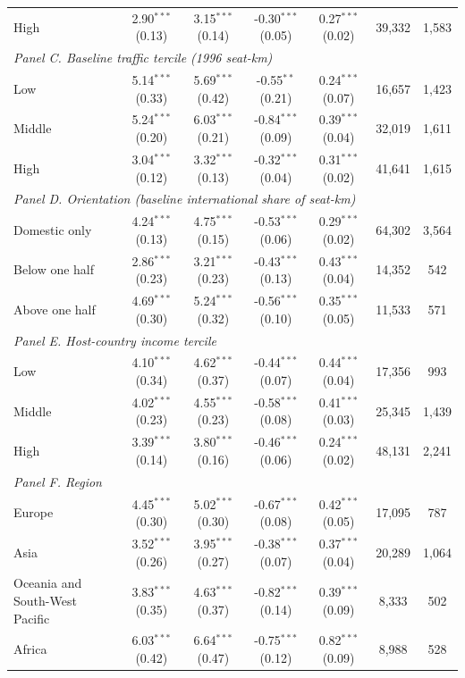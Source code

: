 \documentclass[12pt]{article}
\begin{document}
\begin{table}[htbp]
\begin{threeparttable}
\begin{tabular}{lcccccc}
  High & 2.90$^{***}$ (0.13) & 3.15$^{***}$ (0.14) & -0.30$^{***}$ (0.05) & 0.27$^{***}$ (0.02) & 39,332 & 1,583 \\
\multicolumn{7}{l}{\textit{Panel C. Baseline traffic tercile (1996 seat-km)}} \\
  Low & 5.14$^{***}$ (0.33) & 5.69$^{***}$ (0.42) & -0.55$^{**}$ (0.21) & 0.24$^{***}$ (0.07) & 16,657 & 1,423 \\
  Middle & 5.24$^{***}$ (0.20) & 6.03$^{***}$ (0.21) & -0.84$^{***}$ (0.09) & 0.39$^{***}$ (0.04) & 32,019 & 1,611 \\
  High & 3.04$^{***}$ (0.12) & 3.32$^{***}$ (0.13) & -0.32$^{***}$ (0.04) & 0.31$^{***}$ (0.02) & 41,641 & 1,615 \\
\multicolumn{7}{l}{\textit{Panel D. Orientation (baseline international share of seat-km)}} \\
  Domestic only & 4.24$^{***}$ (0.13) & 4.75$^{***}$ (0.15) & -0.53$^{***}$ (0.06) & 0.29$^{***}$ (0.02) & 64,302 & 3,564 \\
  Below one half & 2.86$^{***}$ (0.23) & 3.21$^{***}$ (0.23) & -0.43$^{***}$ (0.13) & 0.43$^{***}$ (0.04) & 14,352 & 542 \\
  Above one half & 4.69$^{***}$ (0.30) & 5.24$^{***}$ (0.32) & -0.56$^{***}$ (0.10) & 0.35$^{***}$ (0.05) & 11,533 & 571 \\
\multicolumn{7}{l}{\textit{Panel E. Host-country income tercile}} \\
  Low & 4.10$^{***}$ (0.34) & 4.62$^{***}$ (0.37) & -0.44$^{***}$ (0.07) & 0.44$^{***}$ (0.04) & 17,356 & 993 \\
  Middle & 4.02$^{***}$ (0.23) & 4.55$^{***}$ (0.23) & -0.58$^{***}$ (0.08) & 0.41$^{***}$ (0.03) & 25,345 & 1,439 \\
  High & 3.39$^{***}$ (0.14) & 3.80$^{***}$ (0.16) & -0.46$^{***}$ (0.06) & 0.24$^{***}$ (0.02) & 48,131 & 2,241 \\
\multicolumn{7}{l}{\textit{Panel F. Region}} \\
  Europe & 4.45$^{***}$ (0.30) & 5.02$^{***}$ (0.30) & -0.67$^{***}$ (0.08) & 0.42$^{***}$ (0.05) & 17,095 & 787 \\
  Asia & 3.52$^{***}$ (0.26) & 3.95$^{***}$ (0.27) & -0.38$^{***}$ (0.07) & 0.37$^{***}$ (0.04) & 20,289 & 1,064 \\
  Oceania and South-West Pacific & 3.83$^{***}$ (0.35) & 4.63$^{***}$ (0.37) & -0.82$^{***}$ (0.14) & 0.39$^{***}$ (0.09) & 8,333 & 502 \\
  Africa & 6.03$^{***}$ (0.42) & 6.64$^{***}$ (0.47) & -0.75$^{***}$ (0.12) & 0.82$^{***}$ (0.09) & 8,988 & 528 \\

\end{tabular}
\end{threeparttable}
\end{table}
\end{document}

